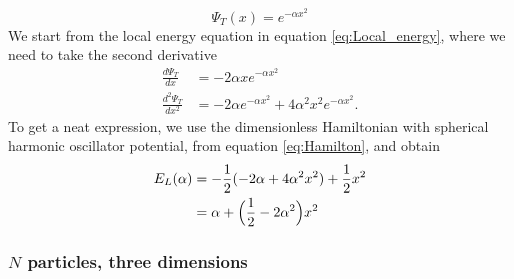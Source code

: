 \documentclass[norsk,a4paper,12pt]{article}
\begin{document}
\begin{equation}
	\label{eq:WF_1dim_1N}
	\Psi_T(x) = e^{-\alpha x^2} 
\end{equation}
We start from the local energy equation in equation \ref{eq:Local_energy}, where we need to take the second derivative
\begin{align}
\frac{d\Psi_T}{dx}&=-2\alpha xe^{-\alpha x^2}\\
\frac{d^2\Psi_T}{dx^2}&=-2\alpha e^{-\alpha x^2}+4\alpha^2x^2e^{-\alpha x^2}.
\end{align}
To get a neat expression, we use the dimensionless Hamiltonian with spherical harmonic oscillator potential, from equation \ref{eq:Hamilton}, and obtain
\begin{align}
E_L(\alpha)&=-\frac{1}{2}(-2\alpha + 4\alpha^2x^2)+\frac{1}{2}x^2\notag\\
&=\alpha+\Big(\frac{1}{2}-2\alpha^2\Big)x^2
\end{align}

\subsubsection{$N$ particles, three dimensions}
\end{document}
